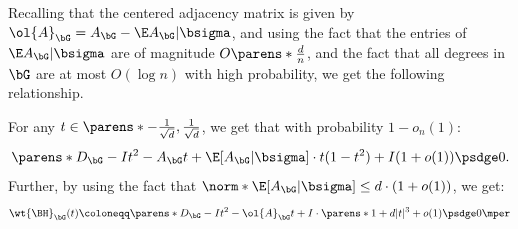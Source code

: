 \documentclass[11pt,letterpaper]{article}
\begin{document}
    Recalling that the centered adjacency matrix is given by $\ol{A}_{\bG} = A_{\bG} - \E A_{\bG} | \bsigma$, and using the fact that the entries of $\E A_{\bG}|\bsigma$ are of magnitude $O\parens*{\frac{d}{n}}$, and the fact that all degrees in $\bG$ are at most $O(\log n)$ with high probability, we get the following relationship.
    \begin{corollary}   \label{cor:bethe-bounds}
        For any $t\in\parens*{-\frac{1}{\sqrt{d}}, \frac{1}{\sqrt{d}}}$, we get that with probability $1-o_n(1)$:
        \[
            \parens*{D_{\bG}-I}t^2 - A_{\bG}t + \E[A_{\bG}|\bsigma] \cdot t(1-t^2) + I (1 + o(1)) \psdge 0.
        \]
        Further, by using the fact that $\norm*{\E[A_{\bG}|\bsigma}] \le d\cdot(1+o(1))$, we get:
        \[
            \wt{\BH}_{\bG}(t) \coloneqq \parens*{D_{\bG}-I}t^2 - \ol{A}_{\bG} t + I \cdot\parens*{1 + d|t|^3 + o(1)} \psdge 0\mper
        \]
    \end{corollary}
\end{document}
